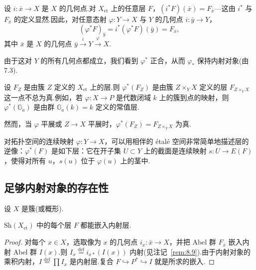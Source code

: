 \begin{remark}\label{rem:8.9}
设 $i \colon \bar{x} \to X$ 是 $X$ 的几何点.对 $X_{\mathrm{et}}$ 上的任意层 $F$，$(i^{*}F)(\bar{x}) = F_{\bar{x}}$---这由 $i^{*}$ 与 $F_{\bar{x}}$ 的定义显然.因此，对任意态射 $\varphi \colon Y \to X$ 与 $Y$ 的几何点 $i \colon \bar{y} \to Y$，
\[
(\varphi^{*}F)_{\bar{y}} = i^{*}(\varphi^{*}F)(\bar{y}) = F_{\bar{x}},
\]
其中 $\bar{x}$ 是 $X$ 的几何点 $\bar{y} \xrightarrow{i} Y \xrightarrow{\varphi} X$.

由于这对 $Y$ 的所有几何点都成立，我们看到 $\varphi^{*}$ 正合，从而 $\varphi_{*}$ 保持内射对象(由 7.3).
\end{remark}

\begin{remark}\label{rem:8.10}
设 $F_Z$ 是由簇 $Z$ 定义的 $X_{\mathrm{et}}$ 上的层.则 $\varphi^{*}(F_Z)$ 是由簇 $Z \times_{Y} X$ 定义的层 $F_{Z \times_{Y} X}$ 这一点不总为真.例如，若 $\varphi \colon X \to P$ 是代数闭域 $k$ 上的簇到点的映射，则 $\varphi^{*}(\mathbb{G}_{a})$ 是由群 $\mathbb{G}_{a}(k) = k$ 定义的常值层.

然而，当 $\varphi$ 平展或 $Z \to X$ 平展时，$\varphi^{*}(F_Z) = F_{Z \times_{Y} X}$ 为真.
\end{remark}

\begin{remark}\label{rem:8.11}
对拓扑空间的连续映射 $\varphi \colon Y \to X$，可以用相伴的 \'etal\'e 空间非常简单地描述层的逆像：$\varphi^{*}(F)$ 是如下层：它在开子集 $U \subset Y$ 上的截面是连续映射 $s \colon U \to E(F)$，使得对所有 $u$，$s(u)$ 位于 $\varphi(u)$ 上的茎中.
\end{remark}

\subsection*{足够内射对象的存在性}

设 $X$ 是簇(或概形).

\begin{proposition}\label{prop:8.12}
$\mathrm{Sh}(X_{\mathrm{et}})$ 中的每个层 $F$ 都能嵌入内射层.
\end{proposition}

\begin{proof}
对每个 $x \in X$，选取像为 $x$ 的几何点 $i_x \colon \bar{x} \to X$，并把 Abel 群 $F_{\bar{x}}$ 嵌入内射 Abel 群 $I(x)$.则 $I_x \overset{\mathrm{def}}{=} i_{x*}(I(x))$ 内射(见注记~\ref{rem:8.9}).由于内射对象的乘积内射，$I \overset{\mathrm{def}}{=} \prod I_x$ 是内射层.复合 $F \hookrightarrow P^{*} \hookrightarrow I$ 就是所求的嵌入.
\end{proof}

